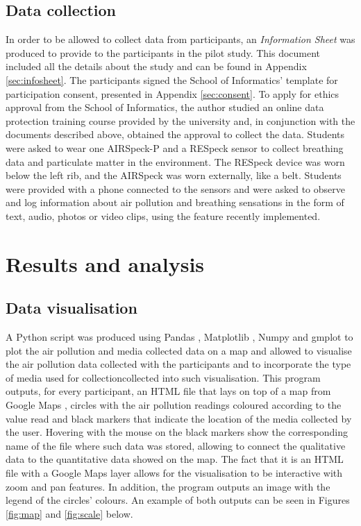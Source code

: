\subsection{Data collection}
In order to be allowed to collect data from participants, an \textit{Information Sheet} was produced to provide to the participants in the pilot study. This document included all the details about the study and can be found in Appendix \ref{sec:infosheet}. The participants signed the School of Informatics' template for participation consent, presented in Appendix \ref{sec:consent}. 
To apply for ethics approval from the School of Informatics, the author studied an online data protection training course provided by the university and, in conjunction with the documents described above, obtained the approval to collect the data.
Students were asked to wear one AIRSpeck-P and a RESpeck sensor to collect breathing data and particulate matter in the environment. The RESpeck device was worn below the left rib, and the AIRSpeck was worn externally, like a belt. Students were provided with a phone connected to the sensors and were asked to observe and log information about air pollution and breathing sensations in the form of text, audio, photos or video clips, using the feature recently implemented.

\section{Results and analysis}

\subsection{Data visualisation}
A Python script was produced using Pandas \cite{pandas}, Matplotlib \cite{matplotlib}, Numpy \cite{numpy} and gmplot \cite{gmplot} to plot the air pollution and media collected data on a map and allowed to visualise the air pollution data collected with the participants and to incorporate the type of media used for collectioncollected into such visualisation. This program outputs, for every participant, an HTML file that lays on top of a map from Google Maps \cite{googlemapsapi}, circles with the air pollution readings coloured according to the value read and black markers that indicate the location of the media collected by the user. Hovering with the mouse on the black markers show the corresponding name of the file where such data was stored, allowing to connect the qualitative data to the quantitative data showed on the map. The fact that it is an HTML file with a Google Maps layer allows for the visualisation to be interactive with zoom and pan features. In addition, the program outputs an image with the legend of the circles' colours. An example of both outputs can be seen in Figures \ref{fig:map} and \ref{fig:scale} below.


